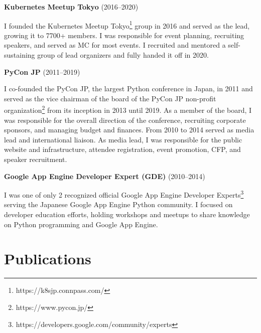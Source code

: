 \documentclass{article}
\begin{document}
\begin{list}{}{
    \setlength{\leftmargin}{0cm}	%
    \setlength{\parsep}{0.15cm}
}
    \item \textbf{\large Kubernetes Meetup Tokyo} (2016--2020)

    I founded the Kubernetes Meetup Tokyo\footnote{https://k8sjp.connpass.com/}
    group in 2016 and served as the lead, growing it to 7700+ members. I was
    responsible for event planning, recruiting speakers, and served as MC for
    most events. I recruited and mentored a self-sustaining group of lead
    organizers and fully handed it off in 2020.

    \item \textbf{\large PyCon JP} (2011--2019)

    I co-founded the PyCon JP, the largest Python conference in Japan, in 2011
    and served as the vice chairman of the board of the PyCon JP non-profit
    organization\footnote{https://www.pycon.jp/} from its inception in 2013
    until 2019. As a member of the board, I was responsible for the overall
    direction of the conference, recruiting corporate sponsors, and managing
    budget and finances. From 2010 to 2014 served as media lead and
    international liaison. As media lead, I was responsible for the public
    website and infrastructure, attendee registration, event promotion, CFP, and
    speaker recruitment.

    \item \textbf{\large Google App Engine Developer Expert (GDE)} (2010--2014)

    I was one of only 2 recognized official Google App Engine Developer
    Experts\footnote{https://developers.google.com/community/experts} serving
    the Japanese Google App Engine Python community. I focused on developer
    education efforts, holding workshops and meetups to share knowledge on
    Python programming and Google App Engine.
\end{list}

\section{Publications}
\end{document}
